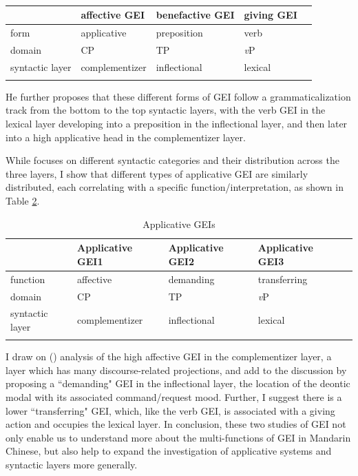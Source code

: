 \documentclass[output=paper,colorlinks,citecolor=brown]{langscibook}
\begin{document}
\begin{table}
\caption{\citealt{Tsai2017}}
\label{kuotab:2:different}
 \begin{tabular}{lllll} 
  \lsptoprule
            & affective GEI & benefactive GEI & giving GEI\\ 
  \midrule
  form  &   applicative &    preposition  &   verb\\
  domain & CP & TP & \textit{v}P\\
  syntactic layer  & complementizer & inflectional & lexical\\
  \lspbottomrule
 \end{tabular}
\end{table}

He further proposes that these different forms of GEI follow a grammaticalization track from the bottom to the top syntactic layers, with the verb GEI in the lexical layer developing into a preposition in the inflectional layer, and then later into a high applicative head in the complementizer layer. 
 
While \citet{Tsai2017} focuses on different syntactic categories and their distribution across the three layers, I show that different types of applicative GEI are similarly distributed, each correlating with a specific function/interpretation, as shown in Table \ref{kuotab:3:different2}.

\begin{table}
\caption{Applicative GEIs}
\label{kuotab:3:different2}
 \begin{tabular}{lllll} 
  \lsptoprule
            & Applicative GEI1 & Applicative GEI2 & Applicative GEI3\\ 
  \midrule
  function & affective & demanding & transferring\\
  domain & CP & TP & \textit{v}P\\
  syntactic layer  & complementizer & inflectional & lexical\\
  \lspbottomrule
 \end{tabular}
\end{table}

I draw on  (\citeyear{Tsai2017}) analysis of the high affective GEI in the complementizer layer, a layer which has many discourse-related projections, and add to the discussion by proposing a “demanding" GEI in the inflectional layer, the location of the deontic modal with its associated command/request mood. Further, I suggest there is a lower “transferring" GEI, which, like the verb GEI, is associated with a giving action and occupies the lexical layer. In conclusion, these two studies of GEI not only enable us to understand more about the multi-functions of GEI in Mandarin Chinese, but also help to expand the investigation of applicative systems and syntactic layers more generally.
\end{document}

